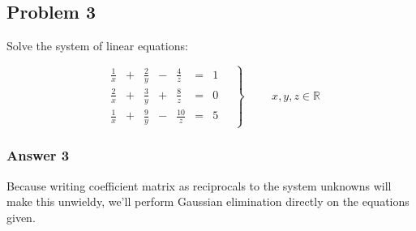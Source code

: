 \documentclass[11pt]{article}
\begin{document}
\subsection{Problem 3}
\label{sec-1-3}

Solve the system of linear equations:

\begin{equation*}
  \left.
    \begin{alignedat}{5}
      &  \frac{1}{x} & {}+{} & \frac{2}{y} & {}-{} & \frac{4}{z}  & {}={} & 1 \\
      &  \frac{2}{x} & {}+{} & \frac{3}{y} & {}+{} & \frac{8}{z}  & {}={} & 0 \\
      &  \frac{1}{x} & {}+{} & \frac{9}{y} & {}-{} & \frac{10}{z} & {}={} & 5
    \end{alignedat}
    \quad \right\} \qquad
  \begin{aligned}
    x, y, z \in \mathbb{R}
  \end{aligned}
\end{equation*}

\subsubsection{Answer 3}
\label{sec-1-3-1}

Because writing coefficient matrix as reciprocals to the system unknowns will make
this unwieldy, we'll perform Gaussian elimination directly on the equations given.
\end{document}
